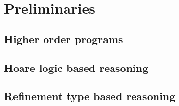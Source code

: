 
\chapter{Preliminaries}
\label{ch:preliminaries}
\vspace{2em}

\section{Higher order programs}

\section{Hoare logic based reasoning}

\section{Refinement type based reasoning}

